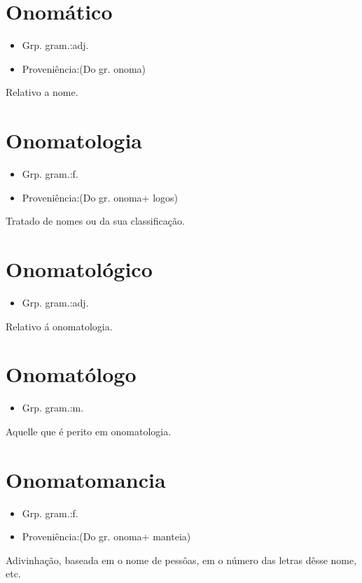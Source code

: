 \section{Onomático}
\begin{itemize}
\item {Grp. gram.:adj.}
\end{itemize}
\begin{itemize}
\item {Proveniência:(Do gr. \textunderscore onoma\textunderscore )}
\end{itemize}
Relativo a nome.
\section{Onomatologia}
\begin{itemize}
\item {Grp. gram.:f.}
\end{itemize}
\begin{itemize}
\item {Proveniência:(Do gr. \textunderscore onoma\textunderscore  + \textunderscore logos\textunderscore )}
\end{itemize}
Tratado de nomes ou da sua classificação.
\section{Onomatológico}
\begin{itemize}
\item {Grp. gram.:adj.}
\end{itemize}
Relativo á onomatologia.
\section{Onomatólogo}
\begin{itemize}
\item {Grp. gram.:m.}
\end{itemize}
Aquelle que é perito em onomatologia.
\section{Onomatomancia}
\begin{itemize}
\item {Grp. gram.:f.}
\end{itemize}
\begin{itemize}
\item {Proveniência:(Do gr. \textunderscore onoma\textunderscore  + \textunderscore manteia\textunderscore )}
\end{itemize}
Adivinhação, baseada em o nome de pessôas, em o número das letras dêsse nome, etc.
